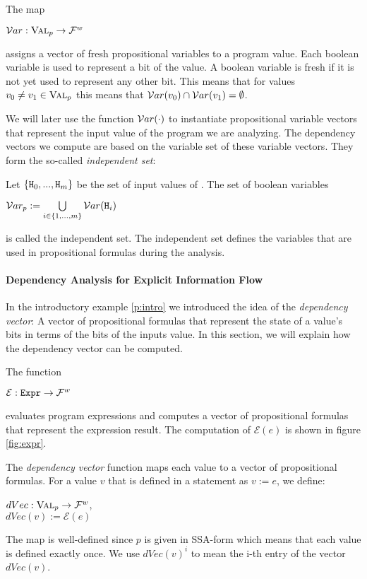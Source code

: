 \begin{definition}
    The map
    \begin{center}
        $\mathcal{V}ar: \textsc{Val}_p \to  \mathcal{F}^w$
    \end{center}
     assigns a vector of fresh propositional variables to a program value. Each boolean variable is used to represent a bit of the value. A boolean variable is fresh if it is not yet used to represent any other bit. This means that for values $v_0 \neq v_1 \in \textsc{Val}_p$ this means that $\mathcal{V}ar(v_0) \cap \mathcal{V}ar(v_1) = \emptyset$.
\end{definition}
We will later use the function $\mathcal{V}ar(\cdot)$ to instantiate propositional variable vectors that represent the input value of the program we are analyzing. The dependency vectors we compute are based on the variable set of these variable vectors. They form the so-called \emph{independent set}:

\begin{definition}
    Let $\{ \mathtt{H}_0, ..., \mathtt{H}_m \}$ be the set of input values of \pp. The set of boolean variables
    \begin{center}
        $\mathcal{V}ar_p := \bigcup\limits_{i \in \{1,..., m\}} \mathcal{V}ar(\mathtt{H}_i)$
    \end{center}
    is called the independent set. The independent set defines the variables that are used in propositional formulas during the analysis.
\end{definition}

\paragraph{Dependency Analysis for Explicit Information Flow}

In the introductory example \ref{p:intro} we introduced the idea of the \emph{dependency vector}: A vector of propositional formulas that represent the state of a value's bits in terms of the bits of the inputs value. In this section, we will explain how the dependency vector can be computed.

\begin{definition}
     The function
    \begin{center}
        $\mathcal{E}: \mathtt{Expr} \to \mathcal{F}^w$
    \end{center}
    evaluates program expressions and computes a vector of propositional formulas that represent the expression result. The computation of $\mathcal{E}(e)$ is shown in figure \ref{fig:expr}.
    
    The \emph{dependency vector} function maps each value to a vector of propositional formulas. For a value $v$ that is defined in a statement as $v := e$, we define:
    \begin{center}
        $dVec: \textsc{Val}_p \to \mathcal{F}^w$,\\
        $dVec(v) := \mathcal{E}(e)$
    \end{center}
    The map is well-defined since $p$ is given in SSA-form which means that each value is defined exactly once.
    We use $dVec(v)^i$ to mean the i-th entry of the vector $dVec(v)$.
\end{definition}

